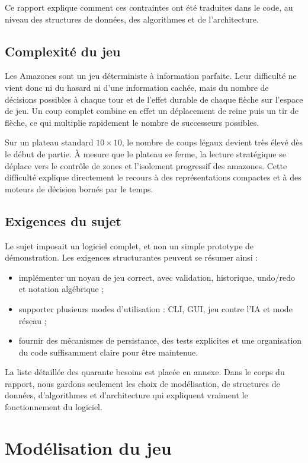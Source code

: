 \documentclass[a4paper]{article}
\begin{document}
Ce rapport explique comment ces contraintes ont été traduites dans le code, au niveau des structures de données, des algorithmes et de l'architecture.

\subsection{Complexité du jeu}

Les Amazones sont un jeu déterministe à information parfaite. Leur difficulté ne vient donc ni du hasard ni d'une information cachée, mais du nombre de décisions possibles à chaque tour et de l'effet durable de chaque flèche sur l'espace de jeu. Un coup complet combine en effet un déplacement de reine puis un tir de flèche, ce qui multiplie rapidement le nombre de successeurs possibles.

Sur un plateau standard $10 \times 10$, le nombre de coups légaux devient très élevé dès le début de partie. À mesure que le plateau se ferme, la lecture stratégique se déplace vers le contrôle de zones et l'isolement progressif des amazones. Cette difficulté explique directement le recours à des représentations compactes et à des moteurs de décision bornés par le temps.

\subsection{Exigences du sujet}

Le sujet imposait un logiciel complet, et non un simple prototype de démonstration. Les exigences structurantes peuvent se résumer ainsi :
\begin{itemize}
    \item implémenter un noyau de jeu correct, avec validation, historique, undo/redo et notation algébrique ;
    \item supporter plusieurs modes d'utilisation : CLI, GUI, jeu contre l'IA et mode réseau ;
    \item fournir des mécanismes de persistance, des tests explicites et une organisation du code suffisamment claire pour être maintenue.
\end{itemize}

La liste détaillée des quarante besoins est placée en annexe. Dans le corps du rapport, nous gardons seulement les choix de modélisation, de structures de données, d'algorithmes et d'architecture qui expliquent vraiment le fonctionnement du logiciel.

\section{Modélisation du jeu}
\end{document}
